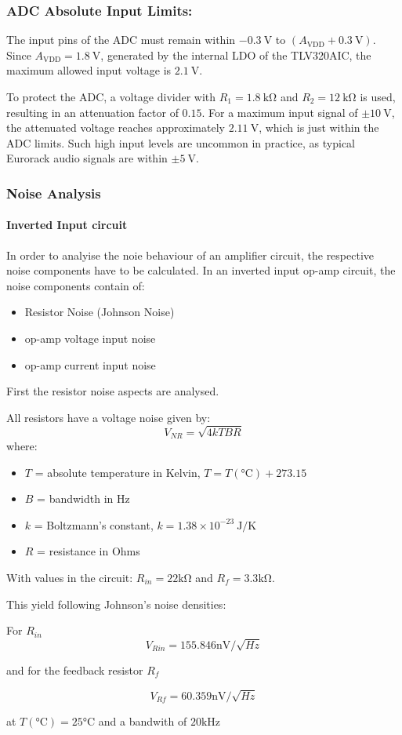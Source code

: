 \noindent
\subsubsection{ADC Absolute Input Limits:} The input pins of the ADC must remain within 
$-0.3~\mathrm{V}$ to $(A_\mathrm{VDD} + 0.3~\mathrm{V})$. Since $A_\mathrm{VDD} = 1.8~\mathrm{V}$, 
generated by the internal LDO of the TLV320AIC, the maximum allowed input voltage is 
$2.1~\mathrm{V}$.

\noindent
To protect the ADC, a voltage divider with $R_1 = 1.8~\mathrm{k\Omega}$ and $R_2 = 12~\mathrm{k\Omega}$ 
is used, resulting in an attenuation factor of $0.15$. For a maximum input signal of $\pm 10~\mathrm{V}$, 
the attenuated voltage reaches approximately $2.11~\mathrm{V}$, which is just within the ADC limits. 
Such high input levels are uncommon in practice, as typical Eurorack audio signals are within $\pm 5~\mathrm{V}$.


\subsubsection{Noise Analysis}

\paragraph{Inverted Input circuit}

In order to analyise the noie behaviour of an amplifier circuit, the respective noise components have to be calculated.
In an inverted input op-amp circuit, the noise components contain of:
\begin{itemize}
	\item Resistor Noise (Johnson Noise)
	\item op-amp voltage input noise
	\item op-amp current input noise
\end{itemize}

First the resistor noise aspects are analysed.

All resistors have a voltage noise given by:
\[
V_{NR} = \sqrt{4 k T B R}
\]
where:  
\begin{itemize}
	\item $T$ = absolute temperature in Kelvin, $T = T(\unit{\degreeCelsius}) + 273.15$
	\item $B$ = bandwidth in \unit{\hertz}
	\item $k$ = Boltzmann's constant, $k = 1.38 \times 10^{-23}~\mathrm{J/K}$
	\item $R$ = resistance in Ohms
\end{itemize}

With values in the circuit: $R_{in} = 22\unit{\kilo\ohm}$ and $R_f = 3.3\unit{\kilo\ohm}$.

This yield following Johnson's noise densities:

For $R_{in}$
\[
V_{Rin} = 155.846 \unit{\nano \volt}/\sqrt{Hz}
\]

and for the feedback resistor $R_f$

\[
V_{Rf} = 60.359 \unit{\nano \volt}/\sqrt{Hz}
\]

at $T(\unit{\degreeCelsius}) = 25 \unit{\degreeCelsius}$ and a bandwith of $20 \unit{\kilo \hertz}$